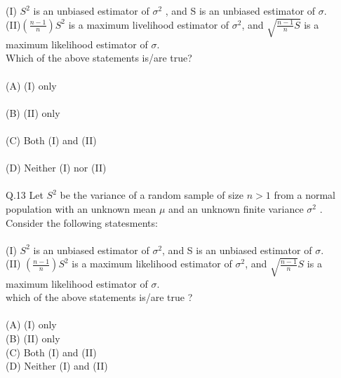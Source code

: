 \documentclass{book}[200pt]
\begin{document}
{	   (I) $S^2$ is an unbiased estimator of $\sigma^2$
, and S is an unbiased estimator of $\sigma$.\\
(II)$(\frac{n-1}{n})S^2$	is a maximum livelihood estimator of $\sigma^2$, and $\sqrt{\frac{n-1}{n}S}$ is a maximum likelihood estimator of $\sigma$.\\Which of the above statements is/are true?\\
\\
(A) (I) only\\
\\
(B) (II) only\\
\\
(C) Both (I) and (II)\\
\\
(D) Neither (I) nor (II)\\
\\
Q.13 Let $S^2$ be the variance of a random sample of size $ n > 1$ from a normal population with an unknown mean $\mu$ and an unknown finite variance $\sigma^2$ . Consider the following statesments:\\
\\
(I) $S^2$ is an unbiased estimator of $\sigma^2$, and S is an unbiased estimator of $\sigma$.\\
(II) $(\frac{n - 1 }{n})S^2$ is a maximum likelihood estimator of $\sigma^2$, and $\sqrt{\frac{n-1}{n}}S$  is a maximum likelihood estimator of $\sigma$.\\
which of the above statements is/are true ?\\
\\
(A) (I) only\\
(B) (II) only \\
(C) Both (I) and (II)\\
(D) Neither (I) and (II)\\

}
\end{document}
